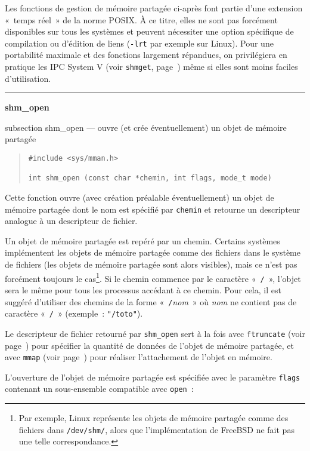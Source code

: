 \documentclass [twoside] {report}
\newcommand {\primitive} [1]
    {
	\phantomsection
	{\large \textbf {#1}}
	\addcontentsline {toc} {subsection} {#1}
    }
\newcommand {\separation}
    {
	\vspace {5mm}
	\nopagebreak
	\hrule
    }
\begin{document}
Les fonctions de gestion de mémoire partagée ci-après font partie d'une
extension «~temps réel~» de la norme POSIX. À ce titre, elles
ne sont pas forcément disponibles sur tous les systèmes et peuvent
nécessiter une option spécifique de compilation ou d'édition de liens
(\verb|-lrt| par exemple sur Linux). Pour une portabilité maximale et
des fonctions largement répandues, on privilégiera en pratique les
IPC System V (voir \texttt {shmget}, page~\pageref {shmget}) même si
elles sont moins faciles d'utilisation.



\separation
\primitive {shm\_open} --- ouvre (et crée éventuellement) un objet de mémoire partagée

\begin {quote}
\begin {verbatim}
#include <sys/mman.h>

int shm_open (const char *chemin, int flags, mode_t mode)
\end{verbatim}
\end {quote}

Cette fonction ouvre (avec création préalable éventuellement)
un objet de mémoire partagée dont le nom est spécifié par \texttt
{chemin} et retourne un descripteur analogue à un descripteur de
fichier.

Un objet de mémoire partagée est repéré par un chemin.  Certains
systèmes implémentent les objets de mémoire partagée comme
des fichiers dans le système de fichiers (les objets de mémoire
partagée sont alors visibles), mais ce n'est pas forcément toujours
le cas\footnote {Par exemple, Linux représente les objets de mémoire
partagée comme des fichiers dans \texttt {/dev/shm/}, alors que
l'implémentation de FreeBSD ne fait pas une telle correspondance.}.
Si le chemin commence par le caractère «~\texttt {/}~», l'objet sera
le même pour tous les processus accédant à ce chemin. Pour cela, il
est suggéré d'utiliser des chemins de la forme «~\texttt {/}\textit
{nom}~» où \textit {nom} ne contient pas de caractère «~\texttt {/}~»
(exemple~: \verb|"/toto"|).

Le descripteur de fichier retourné par \texttt {shm\_open} sert à
la fois avec \texttt {ftruncate} (voir page~\pageref {ftruncate}) pour
spécifier la quantité de données de l'objet de mémoire partagée,
et avec \texttt {mmap} (voir page~\pageref {mmap}) pour réaliser
l'attachement de l'objet en mémoire.

L'ouverture de l'objet de mémoire partagée est spécifiée avec le
paramètre \texttt {flags} contenant un sous-ensemble compatible avec
\texttt {open}~:
\end{document}
